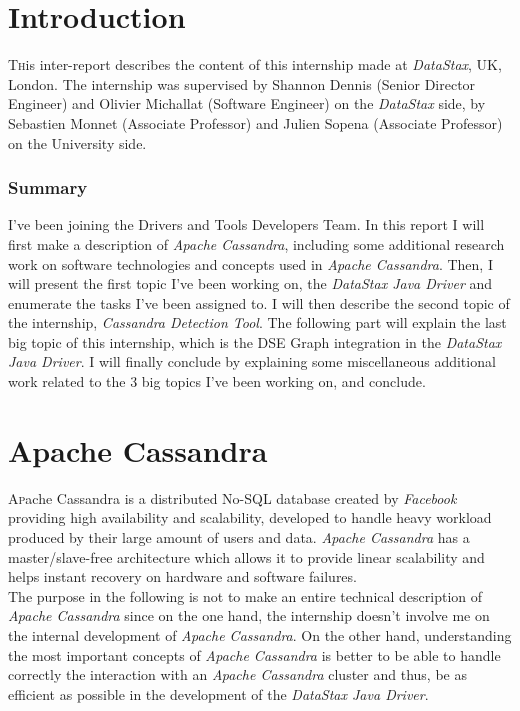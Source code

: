 \documentclass[a4paper]{report}
\newcommand{\ds}{\emph{DataStax\xspace}}
\newcommand{\djd}{\emph{DataStax Java Driver\xspace}}
\newcommand{\ca}{\emph{Apache Cassandra\xspace}}
\newcommand{\cdt}{\emph{Cassandra Detection Tool\xspace}}
\begin{document}


\chapter{Introduction}

\pagestyle{plain}
\lettrine[nindent=0em,lines=3]{T} his inter-report describes the content of this internship made at \ds{}, UK, London. The internship was supervised by Shannon Dennis (Senior Director Engineer) and Olivier Michallat (Software Engineer) on the \ds{} side, by Sebastien Monnet (Associate Professor) and Julien Sopena (Associate Professor) on the University side.\\
\subsection{Summary}
I've been joining the Drivers and Tools Developers Team. In this report I will first make a description of \ca{}, including some additional research work on software technologies and concepts used in \ca{}. Then, I will present the first topic I've been working on, the \djd{} and enumerate the tasks I've been assigned to. I will then describe the second topic of the internship, \cdt{}. The following part will explain the last big topic of this internship, which is the DSE Graph integration in the \djd{}. I will finally conclude by explaining some miscellaneous additional work related to the 3 big topics I've been working on, and conclude.

\chapter{Apache Cassandra}
\lettrine[nindent=0em,lines=3]{A} pache Cassandra is a distributed No-SQL database created by \emph{Facebook} providing high availability and scalability, developed to handle heavy workload produced by their large amount of users and data. \ca{} has a master/slave-free architecture which allows it to provide linear scalability and helps instant recovery on hardware and software failures.\\
The purpose in the following is not to make an entire technical description of \ca{} since on the one hand, the internship doesn't involve me on the internal development of \ca{}. On the other hand, understanding the most important concepts of \ca{} is better to be able to handle correctly the interaction with an \ca{} cluster and thus, be as efficient as possible in the development of the \djd{}.
\end{document}
